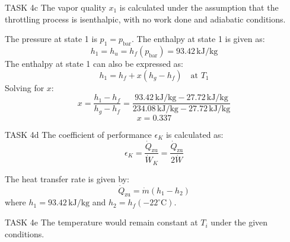 TASK 4c  
The vapor quality \( x_1 \) is calculated under the assumption that the throttling process is isenthalpic, with no work done and adiabatic conditions.  

The pressure at state 1 is \( p_1 = p_{\text{bar}} \).  
The enthalpy at state 1 is given as:  
\[
h_1 = h_u = h_f(p_{\text{bar}}) = 93.42 \, \text{kJ/kg}
\]  
The enthalpy at state 1 can also be expressed as:  
\[
h_1 = h_f + x(h_g - h_f) \quad \text{at } T_1
\]  
Solving for \( x \):  
\[
x = \frac{h_1 - h_f}{h_g - h_f} = \frac{93.42 \, \text{kJ/kg} - 27.72 \, \text{kJ/kg}}{234.08 \, \text{kJ/kg} - 27.72 \, \text{kJ/kg}}
\]  
\[
x = 0.337
\]  

TASK 4d  
The coefficient of performance \( \epsilon_K \) is calculated as:  
\[
\epsilon_K = \frac{\dot{Q}_{\text{zu}}}{\dot{W}_K} = \frac{\dot{Q}_{\text{zu}}}{2 \dot{W}}
\]  

The heat transfer rate is given by:  
\[
\dot{Q}_{\text{zu}} = \dot{m} (h_1 - h_2)
\]  
where \( h_1 = 93.42 \, \text{kJ/kg} \) and \( h_2 = h_f(-22^\circ\text{C}) \).  

TASK 4e  
The temperature would remain constant at \( T_i \) under the given conditions.